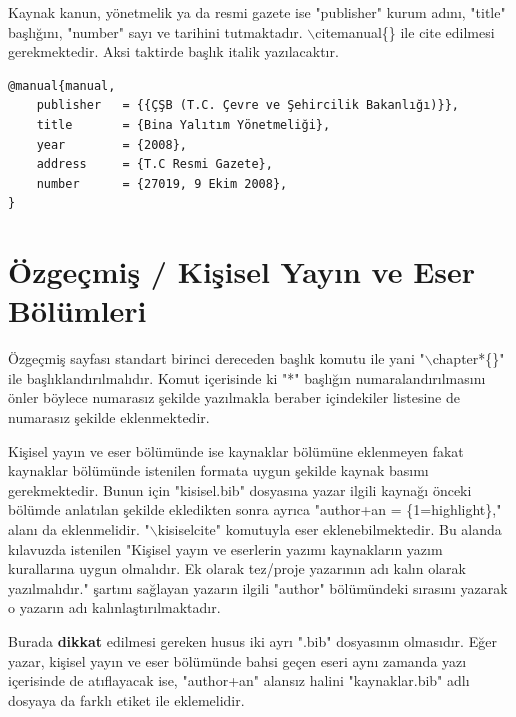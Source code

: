 Kaynak kanun, yönetmelik ya da resmi gazete ise "publisher" kurum adını, "title" başlığını, "number" sayı ve tarihini tutmaktadır. $\backslash$citemanual\{\} ile cite edilmesi gerekmektedir. Aksi taktirde başlık italik yazılacaktır.

\begin{lstlisting}[language={[LaTeX]{TeX}}, label=bib:kanun, caption={Kaynak kanun, yönetmelik ya da resmi gazete ise}]
@manual{manual,
	publisher   = {{ÇŞB (T.C. Çevre ve Şehircilik Bakanlığı)}},
	title 		= {Bina Yalıtım Yönetmeliği},
	year		= {2008},
	address		= {T.C Resmi Gazete},
	number		= {27019, 9 Ekim 2008},	
}
\end{lstlisting}


\chapter{Özgeçmiş / Kişisel Yayın ve Eser Bölümleri }
\label{ch:ozgec}
Özgeçmiş sayfası standart birinci dereceden başlık komutu ile yani "$\backslash$chapter*\{\}" ile başlıklandırılmalıdır. Komut içerisinde ki "*" başlığın numaralandırılmasını önler böylece numarasız şekilde yazılmakla beraber içindekiler listesine de numarasız şekilde eklenmektedir.

Kişisel yayın ve eser bölümünde ise kaynaklar bölümüne eklenmeyen fakat kaynaklar bölümünde istenilen formata uygun şekilde kaynak basımı gerekmektedir. Bunun için "kisisel.bib" dosyasına yazar ilgili kaynağı önceki bölümde anlatılan şekilde ekledikten sonra ayrıca "author+an = \{1=highlight\}," alanı da eklenmelidir. "$\backslash$kisiselcite{}" komutuyla eser eklenebilmektedir. Bu alanda kılavuzda istenilen "Kişisel yayın ve eserlerin yazımı kaynakların yazım kurallarına uygun olmalıdır. Ek olarak tez/proje yazarının adı kalın olarak yazılmalıdır." şartını sağlayan yazarın ilgili "author" bölümündeki sırasını yazarak o yazarın adı kalınlaştırılmaktadır.

Burada \textbf{dikkat} edilmesi gereken husus iki ayrı ".bib" dosyasının olmasıdır. Eğer yazar, kişisel yayın ve eser bölümünde bahsi geçen eseri aynı zamanda yazı içerisinde de atıflayacak ise, "author+an" alansız halini "kaynaklar.bib" adlı dosyaya da farklı etiket ile eklemelidir.


